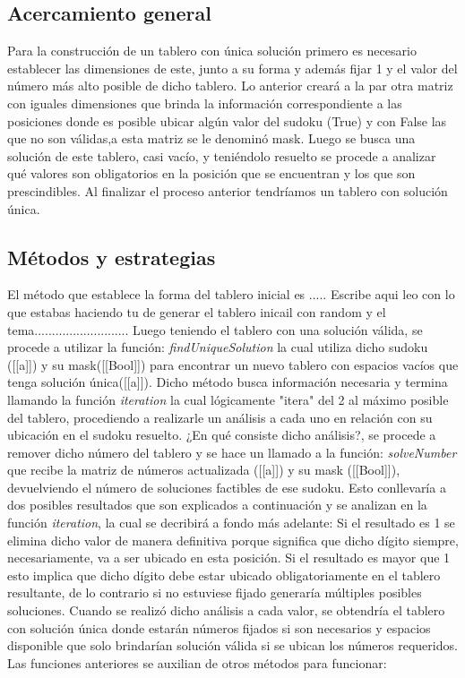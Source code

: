 \documentclass[10pt]{amsart}
\begin{document}
        \subsection*{Acercamiento general}
	Para la construcci\'on de un tablero con \'unica soluci\'on primero es necesario establecer las dimensiones de este, junto a su forma y adem\'as fijar 1 y el valor del n\'umero m\'as alto posible de dicho tablero. Lo anterior crear\'a a la par otra matriz con iguales dimensiones que brinda la informaci\'on correspondiente a las posiciones donde es posible ubicar alg\'un valor del sudoku (True) y con False las que no son v\'alidas,a esta matriz se le denomin\'o mask. Luego se busca una soluci\'on de este tablero, casi vac\'io, y teni\'endolo resuelto se procede a analizar qué valores son obligatorios en la posici\'on que se encuentran y los que son prescindibles. Al finalizar el proceso anterior tendr\'iamos un tablero con soluci\'on \'unica.
	
        \subsection*{M\'etodos y estrategias}
	El m\'etodo que establece la forma del tablero inicial es ..... Escribe aqui leo con lo que estabas haciendo tu de generar el tablero inicail con random y el tema...........................
	Luego teniendo el tablero con una soluci\'on v\'alida, se procede a utilizar la funci\'on:
	\textit{findUniqueSolution} la cual utiliza dicho sudoku ([[a]]) y su mask([[Bool]]) para encontrar un nuevo tablero con espacios vac\'ios que tenga soluci\'on \'unica([[a]]). Dicho m\'etodo busca informaci\'on necesaria y termina llamando la funci\'on \textit{iteration} la cual l\'ogicamente "itera" del 2 al m\'aximo posible del tablero, procediendo a realizarle un an\'alisis a cada uno en relaci\'on con su ubicaci\'on en el sudoku resuelto. ¿En qu\'e consiste dicho an\'alisis?, se procede a remover dicho n\'umero del tablero y se hace un llamado a la funci\'on:
	 \textit{solveNumber} que recibe la matriz de n\'umeros actualizada ([[a]]) y su mask ([[Bool]]), devuelviendo el n\'umero de soluciones factibles de ese sudoku. Esto conllevar\'ia a dos posibles resultados que son explicados a continuaci\'on y se analizan en la funci\'on \textit{iteration}, la cual se decribir\'a a fondo m\'as adelante:
	 Si el resultado es 1 se elimina dicho valor de manera definitiva porque significa que dicho d\'igito siempre, necesariamente, va a ser ubicado en esta posici\'on.
	 Si el resultado es mayor que 1 esto implica que dicho d\'igito debe estar ubicado obligatoriamente en el tablero resultante, de lo contrario si no estuviese fijado generar\'ia m\'ultiples posibles soluciones.
	 Cuando se realiz\'o dicho an\'alisis a cada valor, se obtendr\'ia el tablero con soluci\'on \'unica donde estar\'an n\'umeros fijados si son necesarios y espacios disponible que solo brindar\'ian soluci\'on v\'alida si se ubican los n\'umeros requeridos.
	 Las funciones anteriores se auxilian de otros m\'etodos para funcionar:
	 
\end{document}
